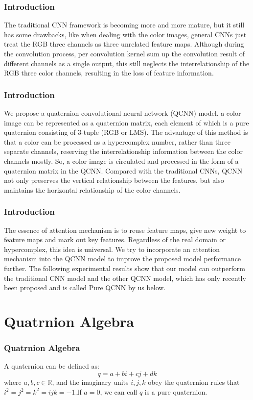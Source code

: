 \documentclass{beamer}
\begin{document}
\begin{frame}
    \frametitle{Introduction}
The traditional CNN framework is becoming more and more mature, but it still has some drawbacks, like when dealing with the color images, general CNNs just treat the RGB three channels as three unrelated feature maps. Although during the convolution process, per convolution kernel sum up the convolution result of different channels as a single output, this still neglects the interrelationship of the RGB three color channels, resulting in the loss of feature information.
\end{frame}

\begin{frame}
    \frametitle{Introduction}
We propose a quaternion convolutional neural network (QCNN) model. a color image can be represented as a quaternion
matrix, each element of which is a pure quaternion consisting of 3-tuple (RGB or LMS). The advantage of this method is that a color can be processed as a hypercomplex number, rather than three separate channels, reserving the interrelationship information between the color channels mostly. So, a color image is circulated and processed in the form of a quaternion matrix in the QCNN. Compared with the traditional CNNs, QCNN not only preserves the vertical relationship between the features, but also maintains the horizontal relationship of the color channels.
\end{frame}

\begin{frame}
    \frametitle{Introduction}
The essence of attention mechanism is to reuse feature maps, give new weight to feature maps and mark out key features. Regardless of the real domain or hypercomplex, this idea is universal. We try to incorporate an attention mechanism into the QCNN model to improve the proposed model performance further. The following experimental results show that our model can outperform the traditional CNN model and the other QCNN model, which has only recently been proposed and is called Pure QCNN by us below.
\end{frame}


\section{Quatrnion Algebra}
\begin{frame}
    \frametitle{Quatrnion Algebra}
A quaternion can be defined as:
$$q=a+bi+cj+dk$$
where $a,b,c\in \mathbb{R}$, and the imaginary units $i,j,k$ obey the quaternion rules that $i^2=j^2=k^2=ijk=-1$.If $a = 0$, we can call $q$ is a pure quaternion.
\end{frame}
\end{document}
